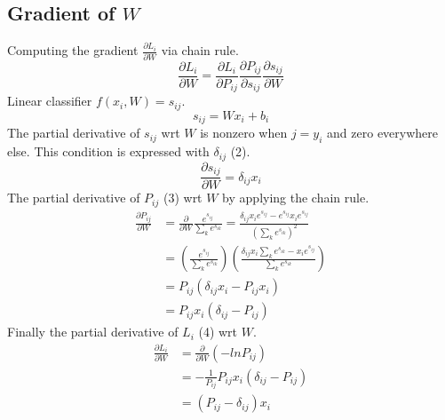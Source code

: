 \documentclass[12pt, letter]{article}
\begin{document}
\subsection{Gradient of $W$}
Computing the gradient $\frac{\partial L_i}{\partial W}$ via chain rule.
\begin{equation}\nonumber
  \frac{\partial L_i}{\partial W} =
  \frac{\partial L_i}{\partial P_{ij}} \frac{\partial P_{ij}}{\partial s_{ij}} \frac{\partial s_{ij}}{\partial W}
\end{equation}
Linear classifier $f(x_i, W) = s_{ij}$.
\begin{equation}
  s_{ij} = Wx_i + b_i
\end{equation}
The partial derivative of $s_{ij}$ wrt $W$ is nonzero when $j=y_i$
and zero everywhere else. This condition is expressed with $\delta_{ij}$ (2).
\begin{equation}\nonumber
  \frac{\partial s_{ij}}{\partial W} = \delta_{ij} x_i
\end{equation}
The partial derivative of $P_{ij}$ (3) wrt $W$ by applying the chain rule.
\begin{equation}\nonumber
\begin{split}
  \frac{\partial P_{ij}}{\partial W}& = \frac{\partial}{\partial W}\frac{e^{s_{ij}}}{\sum_ke^{s_{ik}}} = \frac{\delta_{ij}x_ie^{s_{ij}}-e^{s_{ij}}x_ie^{s_{ij}}}{\left(\sum_ke^{s_{ik}}\right)^2}\\
  & = \left(\frac{e^{s_{ij}}}{\sum_ke^{s_{ik}}}\right)\left(\frac{\delta_{ij}x_i\sum_ke^{s_{ik}}-x_ie^{s_{ij}}}{\sum_ke^{s_{ik}}}\right)\\
  & = P_{ij} (\delta_{ij}x_i - P_{ij}x_i) \\
  & = P_{ij}x_i(\delta_{ij} - P_{ij})
\end{split}
\end{equation}
Finally the partial derivative of $L_i$ (4) wrt $W$.
\begin{equation}
\begin{split}
  \frac{\partial L_i}{\partial W}& = \frac{\partial}{\partial W}\left(-lnP_{ij}\right)\\
  & = -\frac{1}{P_{ij}} P_{ij}x_i(\delta_{ij} - P_{ij})\\
  & = (P_{ij} - \delta_{ij}) x_i
\end{split}
\end{equation}
\pagebreak
\end{document}
